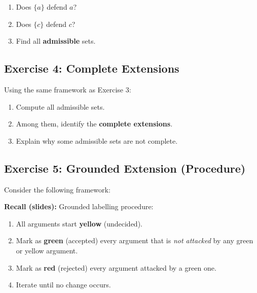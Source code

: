 \documentclass[11pt]{article}
\begin{document}
\begin{center}
\end{center}

\begin{enumerate}
    \item Does $\{a\}$ defend $a$?
    \item Does $\{c\}$ defend $c$?
    \item Find all \textbf{admissible} sets.
\end{enumerate}

\subsection{Exercise 4: Complete Extensions}

Using the same framework as Exercise 3:

\begin{enumerate}
    \item Compute all admissible sets.
    \item Among them, identify the \textbf{complete extensions}.
    \item Explain why some admissible sets are not complete.
\end{enumerate}

\subsection{Exercise 5: Grounded Extension (Procedure)}

Consider the following framework:

\begin{center}
\end{center}

\textbf{Recall (slides):}
Grounded labelling procedure:
\begin{enumerate}
    \item All arguments start \textbf{yellow} (undecided).
    \item Mark as \textbf{green} (accepted) every argument that is \emph{not attacked} by any green or yellow argument.
    \item Mark as \textbf{red} (rejected) every argument attacked by a green one.
    \item Iterate until no change occurs.
\end{enumerate}
\end{document}
